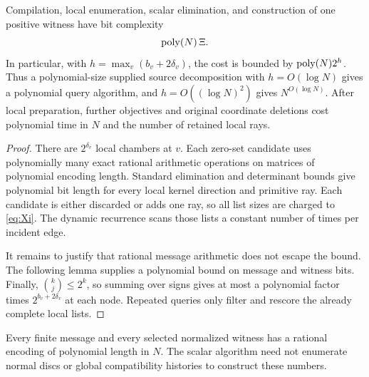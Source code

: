 \begin{theorem}
\label{thm:implemented}
Compilation, local enumeration, scalar elimination, and construction of one
positive witness have bit complexity
\[
 \operatorname{poly}(N)\,\Xi.
\]
In particular, with $h=\max_v(b_v+2\delta_v)$, the cost is bounded by
$\operatorname{poly}(N)2^h$. Thus a polynomial-size supplied source decomposition with
$h=O(\log N)$ gives a polynomial query algorithm, and
$h=O((\log N)^2)$ gives $N^{O(\log N)}$.
After local preparation, further objectives and original coordinate deletions
cost polynomial time in $N$ and the number of retained local rays.
\end{theorem}

\begin{proof}
There are $2^{\delta_v}$ local chambers at $v$. Each zero-set candidate uses
polynomially many exact rational arithmetic operations on matrices of
polynomial encoding length. Standard elimination and determinant bounds give
polynomial bit length for every local kernel direction and primitive ray.
Each candidate is either discarded or adds one ray, so all list sizes are
charged to \eqref{eq:Xi}. The dynamic recurrence scans those lists a constant
number of times per incident edge.

It remains to justify that rational message arithmetic does not escape the
bound. The following lemma supplies a polynomial bound on message and witness
bits. Finally, $\binom{k}{j}\leq2^k$, so summing over signs gives at most a
polynomial factor times $2^{b_v+2\delta_v}$ at each node. Repeated queries only
filter and rescore the already complete local lists.
\end{proof}

\begin{lemma}
\label{lem:bits}
Every finite message and every selected normalized witness has a rational
encoding of polynomial length in $N$. The scalar algorithm need not enumerate
normal discs or global compatibility histories to construct these numbers.
\end{lemma}

